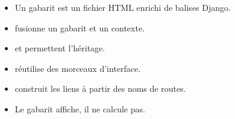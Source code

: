 \begin{retenir}
\begin{itemize}
  \item Un gabarit est un fichier HTML enrichi de balises Django.
  \item {} fusionne un gabarit et un contexte.
  \item {} et  permettent l'héritage.
  \item {} réutilise des morceaux d'interface.
  \item {} construit les liens à partir des noms de routes.
  \item Le gabarit affiche, il ne calcule pas.
\end{itemize}
\end{retenir}
